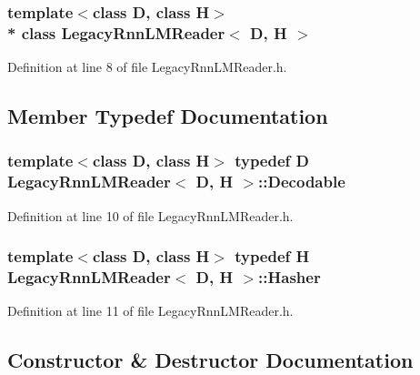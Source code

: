\subsubsection*{template$<$class D, class H$>$\\*
class Legacy\+Rnn\+L\+M\+Reader$<$ D, H $>$}



Definition at line 8 of file Legacy\+Rnn\+L\+M\+Reader.\+h.



\subsection{Member Typedef Documentation}
\subsubsection[{Decodable}]{\setlength{\rightskip}{0pt plus 5cm}template$<$class D, class H$>$ typedef D {\bf Legacy\+Rnn\+L\+M\+Reader}$<$ D, H $>$\+::{\bf Decodable}}\hypertarget{class_legacy_rnn_l_m_reader_ae3a5ef6d59831a336e91c6933f7af5e9}{}\label{class_legacy_rnn_l_m_reader_ae3a5ef6d59831a336e91c6933f7af5e9}


Definition at line 10 of file Legacy\+Rnn\+L\+M\+Reader.\+h.

\subsubsection[{Hasher}]{\setlength{\rightskip}{0pt plus 5cm}template$<$class D, class H$>$ typedef H {\bf Legacy\+Rnn\+L\+M\+Reader}$<$ D, H $>$\+::{\bf Hasher}}\hypertarget{class_legacy_rnn_l_m_reader_a9570c6882bd7468cb69e741c266865da}{}\label{class_legacy_rnn_l_m_reader_a9570c6882bd7468cb69e741c266865da}


Definition at line 11 of file Legacy\+Rnn\+L\+M\+Reader.\+h.



\subsection{Constructor \& Destructor Documentation}
